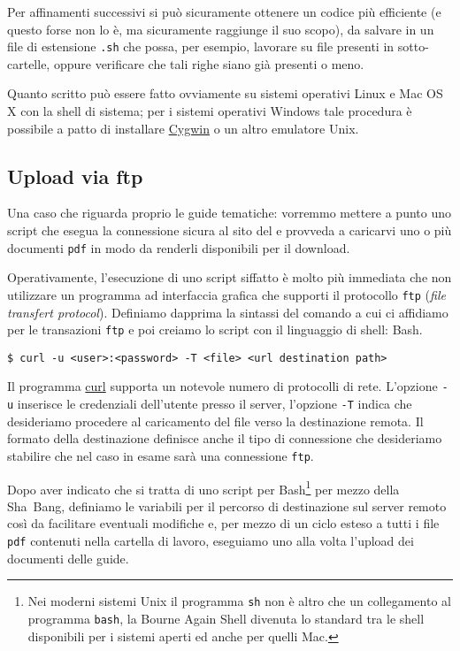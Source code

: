 Per affinamenti successivi si può sicuramente ottenere un codice più efficiente
(e questo forse non lo è, ma sicuramente raggiunge il suo scopo), da salvare in
un file di estensione \texttt{.sh} che possa, per esempio, lavorare su file
presenti in sotto-cartelle, oppure verificare che tali righe siano già presenti
o meno.

Quanto scritto può essere fatto ovviamente su sistemi operativi Linux e Mac OS
X con la shell di sistema; per i sistemi operativi Windows tale procedura è
possibile a patto di installare \href{http://www.cygwin.com/}{Cygwin} o un
altro emulatore Unix.

\subsection{Upload via ftp}

Una caso che riguarda proprio le guide tematiche: vorremmo mettere a punto uno
script che esegua la connessione sicura al sito del \GuIT*{} e provveda a
caricarvi uno o più documenti \texttt{pdf} in modo da renderli disponibili per
il download.

Operativamente, l'esecuzione di uno script siffatto è molto più immediata che
non utilizzare un programma ad interfaccia grafica che supporti il protocollo
\texttt{ftp} (\emph{file transfert protocol}). Definiamo dapprima la sintassi
del comando  a cui ci affidiamo per le transazioni \texttt{ftp} e
poi creiamo lo script con il linguaggio di shell:
Bash.
\begin{Verbatim}
$ curl -u <user>:<password> -T <file> <url destination path>
\end{Verbatim}

Il programma \href{http://curl.haxx.se/}{curl} supporta un notevole numero di
protocolli di rete. L'opzione \texttt{-u} inserisce le credenziali dell'utente
presso il server, l'opzione \texttt{-T} indica che desideriamo procedere al
caricamento del file verso la destinazione remota. Il formato della destinazione definisce anche il tipo di connessione che desideriamo stabilire che nel caso in
esame sarà una connessione \texttt{ftp}.

Dopo aver indicato che si tratta di uno script per Bash\footnote{Nei moderni
  sistemi Unix il programma \texttt{sh} non è altro che un collegamento al
  programma \texttt{bash}, la Bourne Again Shell divenuta lo standard tra le
  shell disponibili per i sistemi aperti ed anche per quelli Mac.} per mezzo
della Sha~Bang, definiamo le variabili per il percorso di destinazione sul
server remoto così da facilitare eventuali modifiche e, per mezzo di un ciclo
esteso a tutti i file \texttt{pdf} contenuti nella cartella di lavoro,
eseguiamo uno alla volta l'upload dei documenti delle guide.

